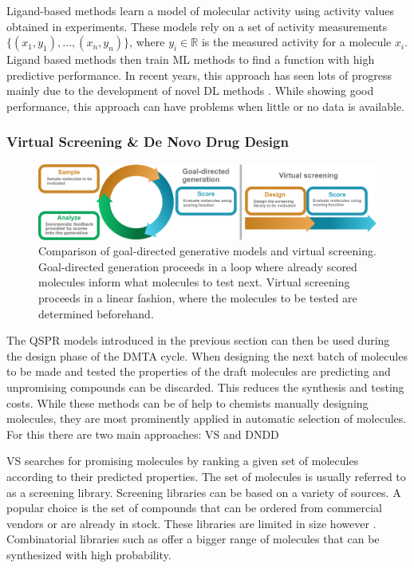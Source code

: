 Ligand-based methods learn a model of molecular activity using activity values obtained in experiments.
\newcommand{\reals}{\mathbb{R}}
These models rely on a set of activity measurements $\{(x_1, y_1), \dots, (x_n, y_n)\}$, where $y_i \in \reals$ is the measured 
activity for a molecule $x_i$. Ligand based methods then train \ac{ML} methods to find a function with high 
predictive performance. In recent years, this approach has seen lots of progress mainly  due to the 
development of novel \ac{DL} methods \citep{todo}. While showing good performance, this approach 
can have problems when little or no data is available. 

\subsubsection{Virtual Screening \& De Novo Drug Design}
\begin{figure}
    \centering
    \includegraphics[width=\textwidth]{./figures/goal_directed_cycle_and_virtual_screening.pdf}
    \caption{Comparison of goal-directed generative models and virtual screening.
    Goal-directed generation proceeds in a loop where already scored molecules 
    inform what molecules to test next. Virtual screening proceeds in a linear 
    fashion, where the molecules to be tested are determined beforehand. 
    }
\end{figure}
The \ac{QSPR} models introduced in the previous section can then be used during
the design phase of the DMTA cycle. When designing the next batch of molecules to be made and tested
the properties of the draft molecules are predicting and unpromising compounds can be discarded. 
This reduces the synthesis and testing costs. While these methods can be of help to chemists 
manually designing molecules, they are most prominently applied in automatic selection 
of molecules. For this there are two main approaches: \Ac{VS} and \ac{DNDD}

\Ac{VS} searches for promising molecules by ranking a given set of molecules according 
to their predicted properties. The set of molecules is usually referred to as a screening library.
Screening libraries can be based on a variety of sources. A popular choice is the set of compounds 
that can be ordered from commercial vendors or are already in stock. These libraries are limited 
in size however \citep{todo}. Combinatorial libraries such as \citep{todo} offer a bigger range of 
molecules that can be synthesized with high probability.

